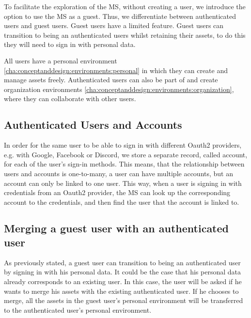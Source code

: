 To facilitate the exploration of the MS, without creating a user, we introduce the option
to use the MS as a guest.
Thus, we differentiate between authenticated users and guest users.
Guest users have a limited feature. 
Guest users can transition to being an authenticated users whilst retaining their
assets, to do this they will need to sign in with personal data.

All users have a personal environment \ref{cha:conceptanddesign:environments:personal}
in which they can create and manage assets freely.
Authenticated users can also be part of and create organization environments
\ref{cha:conceptanddesign:environments:organization},
where they can collaborate with other users.

\subsection{Authenticated Users and Accounts}

In order for the same user to be able to sign in with different Oauth2 providers, e.g. with Google,
Facebook or Discord, we store a separate record, called account, for each of the user's sign-in methods.
This means, that the relationship between users and accounts is one-to-many,
a user can have multiple accounts, but an account can only be linked to one user.
This way, when a user is signing in with credentials from an Oauth2 provider, 
the MS can look up the corresponding account to the credentials, and then find the user
that the account is linked to.


\subsection{Merging a guest user with an authenticated user}
\label{cha:conceptanddesign:users:mergeguestuser}

As previously stated, a guest user can transition to being an authenticated user by
signing in with his personal data.
It could be the case that his personal data already corresponds to an existing user.
In this case, the user will be asked if he wants to merge his assets with the existing
authenticated user.
If he chooses to merge, all the assets in the guest user's personal environment will be
transferred to the authenticated user's personal environment.

